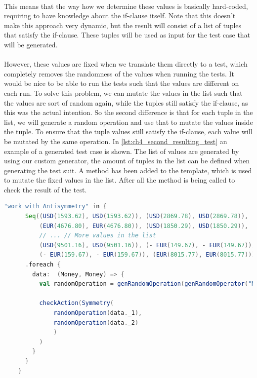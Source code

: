 \\
This means that the way how we determine these values is basically hard-coded, requiring to have knowledge about the if-clause itself. Note that this doesn't make this approach very dynamic, but the result will consist of a list of tuples that satisfy the if-clause. These tuples will be used as input for the test case that will be generated.\\
\\
However, these values are fixed when we translate them directly to a test, which completely removes the randomness of the values when running the tests. It would be nice to be able to run the tests such that the values are different on each run. To solve this problem, we can mutate the values in the list such that the values are sort of random again, while the tuples still satisfy the if-clause, as this was the actual intention. So the second difference is that for each tuple in the list, we will generate a random operation and use that to mutate the values inside the tuple. To ensure that the tuple values still satisfy the if-clause, each value will be mutated by the same operation. In \autoref{lst:ch4_second_resulting_test} an example of a generated test case is shown. The list of values are generated by using our custom generator, the amount of tuples in the list can be defined when generating the test suit. A method  has been added to the template, which is used to mutate the fixed values in the list. After all the  method is being called to check the result of the test.
\\
\begin{sourcecode}[h!]
\begin{lstlisting}[language=Scala]
"work with Antisymmetry" in {
      Seq((USD(1593.62), USD(1593.62)), (USD(2869.78), USD(2869.78)), 
          (EUR(4676.80), EUR(4676.80)), (USD(1850.29), USD(1850.29)), 
          // ... // More values in the list
          (USD(9501.16), USD(9501.16)), (- EUR(149.67), - EUR(149.67)),  
          (- EUR(159.67), - EUR(159.67)), (EUR(8015.77), EUR(8015.77)))
      .foreach {
        data:  (Money, Money) => {
          val randomOperation = genRandomOperation(genRandomOperator("Money", true), generateRandomMoney(data._1.currency), generateRandomInteger(true), generateRandomInteger(false), generateRandomPercentage(true), generateRandomPercentage(false), Random.nextInt(10))

          checkAction(Symmetry(
              randomOperation(data._1),
              randomOperation(data._2)
              )
          )
        }
      }
    }
\end{lstlisting}
\caption{Resulting test case with semi-random values. Omitted some input tuples for readability.}
\label{lst:ch4_second_resulting_test}
\end{sourcecode}
